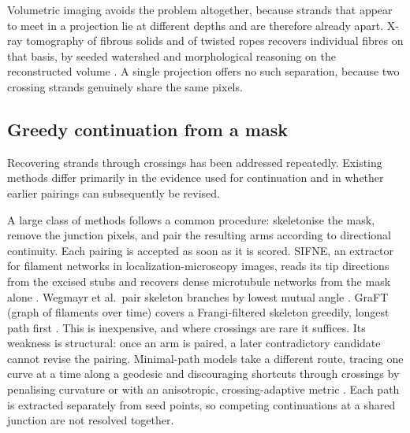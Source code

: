 Volumetric imaging avoids the problem altogether, because strands that appear
to meet in a projection lie at different depths and are therefore already
apart. X-ray tomography of fibrous solids and of twisted ropes recovers
individual fibres on that basis, by seeded watershed and morphological
reasoning on the reconstructed volume
\citep{depriester2022fibre,allan2025rope}. A single projection offers no such
separation, because two crossing strands genuinely share the same pixels.

\subsection{Greedy continuation from a mask}
\label{sec:rel-greedy}

Recovering strands through crossings has been addressed repeatedly. Existing
methods differ primarily in the evidence used for continuation and in whether
earlier pairings can subsequently be revised.

A large class of methods follows a common procedure: skeletonise the mask,
remove the junction pixels, and pair the resulting arms according to
directional continuity. Each pairing is accepted as soon as it is scored.
SIFNE, an extractor for filament networks in localization-microscopy
images, reads its tip
directions from the excised stubs and recovers dense microtubule networks from
the mask alone \citep{zhang2017sifne}. Wegmayr et al.\ pair skeleton branches
by lowest mutual angle \citep{wegmayr2020microplastic}. GraFT (graph of
filaments over time) covers a Frangi-filtered skeleton greedily, longest path first
\citep{osterlund2026graft}. This is inexpensive, and where crossings are rare
it suffices. Its weakness is structural: once an arm is paired, a later
contradictory candidate cannot revise the pairing. Minimal-path models take a
different route, tracing one curve at a time along a geodesic and discouraging
shortcuts through crossings by penalising curvature \citep{liu2023geodesics}
or with an anisotropic, crossing-adaptive metric \citep{liu2020minimalpath}.
Each path is extracted separately from seed points, so competing
continuations at a shared junction are not resolved together.

